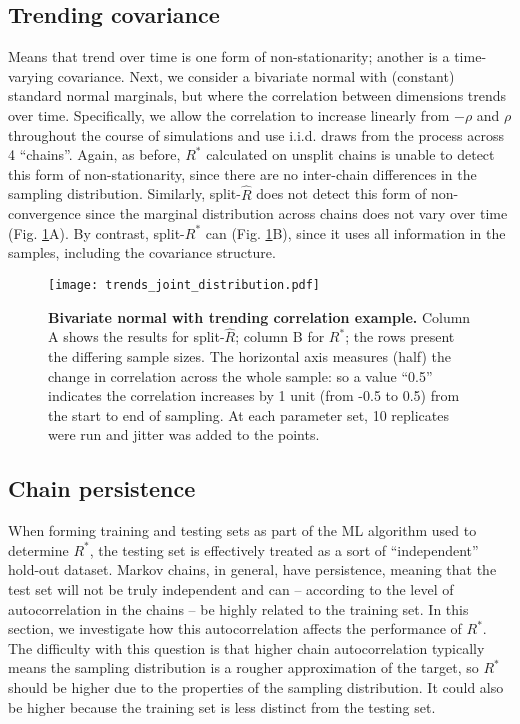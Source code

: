 \documentclass{article}
\begin{document}
\subsection{Trending covariance}\label{sec:non-stationary_covariance}
Means that trend over time is one form of non-stationarity; another is a time-varying covariance. Next, we consider a bivariate normal with (constant) standard normal marginals, but where the correlation between dimensions trends over time. Specifically, we allow the correlation to increase linearly from $-\rho$ and $\rho$ throughout the course of simulations and use i.i.d. draws from the process across 4 ``chains''. Again, as before, $R^*$ calculated on unsplit chains is unable to detect this form of non-stationarity, since there are no inter-chain differences in the sampling distribution. Similarly, split-$\widehat{R}$ does not detect this form of non-convergence since the marginal distribution across chains does not vary over time (Fig. \ref{fig:trends_joint_distribution}A). By contrast, split-$R^*$ can (Fig. \ref{fig:trends_joint_distribution}B), since it uses all information in the samples, including the covariance structure.

\begin{figure}[!htb]
	\centerline{\texttt{[image: trends\_joint\_distribution.pdf]}}
	\caption{\textbf{Bivariate normal with trending correlation example.} Column A shows the results for split-$\widehat{R}$; column B for $R^*$; the rows present the differing sample sizes. The horizontal axis measures (half) the change in correlation across the whole sample: so a value ``0.5'' indicates the correlation increases by 1 unit (from -0.5 to 0.5) from the start to end of sampling. At each parameter set, 10 replicates were run and jitter was added to the points.}
	\label{fig:trends_joint_distribution}
\end{figure}

\subsection{Chain persistence}\label{sec:non-stationary_persistence}
When forming training and testing sets as part of the ML algorithm used to determine $R^*$, the testing set is effectively treated as a sort of ``independent'' hold-out dataset. Markov chains, in general, have persistence, meaning that the test set will not be truly independent and can -- according to the level of autocorrelation in the chains -- be highly related to the training set. In this section, we investigate how this autocorrelation affects the performance of $R^*$. The difficulty with this question is that higher chain autocorrelation typically means the sampling distribution is a rougher approximation of the target, so $R^*$ should be higher due to the properties of the sampling distribution. It could also be higher because the training set is less distinct from the testing set.
\end{document}
